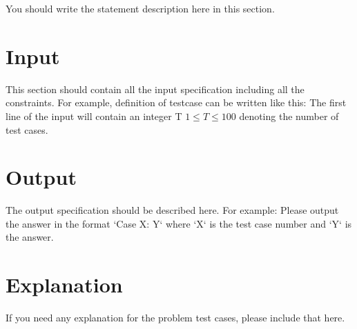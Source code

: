     You should write the statement description here in this section.

\section*{Input}
    This section should contain all the input specification including all the
    constraints. For example, definition of testcase can be written like this:
    The first line of the input will contain an integer T $1 \le T \le 100$
    denoting the number of test cases.

\section*{Output}
    The output specification should be described here. For example: Please
    output the answer in the format `Case X: Y` where `X` is the test case
    number and `Y` is the answer.


\section*{Explanation}
    If you need any explanation for the problem test cases, please include
    that here.